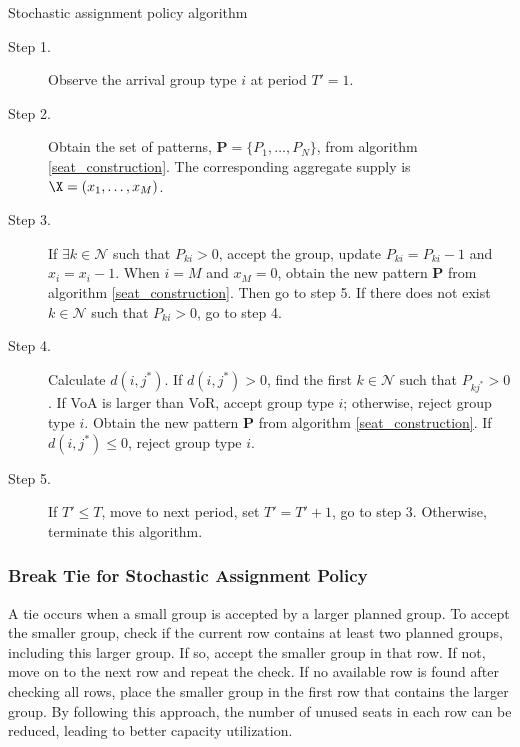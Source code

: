 \begin{algorithm}[H]
  \caption{Stochastic assignment policy algorithm}\label{algo_dynamic_policy}
  \begin{description}
    \item[Step 1.] Observe the arrival group type $i$ at period $T{'} =1$.
    \item[Step 2.] Obtain the set of patterns, $\mathbf{P} = \{P_1,\ldots,P_{N}\}$, from algorithm \ref{seat_construction}. The corresponding aggregate supply is $\X = (x_{1}, \ldots, x_{M})$.
    \item[Step 3.] If $\exists k \in \mathcal{N}$ such that $P_{ki} > 0$, accept the group, update $P_{ki} = P_{ki} -1$ and $x_{i} = x_{i} -1$. When $i = M$ and $x_{M} = 0$, obtain the new pattern $\mathbf{P}$ from algorithm \ref{seat_construction}. Then go to step 5. If there does not exist $k \in \mathcal{N}$ such that $P_{ki} > 0$, go to step 4.
    \item[Step 4.] Calculate $d(i,j^{*})$. If $d(i,j^{*})>0$, find the first $k \in \mathcal{N}$ such that $P_{k j^{*}} >0$. If VoA is larger than VoR, accept group type $i$; otherwise, reject group type $i$. Obtain the new pattern $\mathbf{P}$ from algorithm \ref{seat_construction}. If $d(i,j^{*}) \leq 0$, reject group type $i$.
    \item[Step 5.] If $T{'} \leq T$, move to next period, set $T{'} = T{'}+1$, go to step 3. Otherwise, terminate this algorithm.
  \end{description}
\end{algorithm}

\subsubsection{Break Tie for Stochastic Assignment Policy}
A tie occurs when a small group is accepted by a larger planned group. To accept the smaller group, check if the current row contains at least two planned groups, including this larger group. If so, accept the smaller group in that row. If not, move on to the next row and repeat the check. If no available row is found after checking all rows, place the smaller group in the first row that contains the larger group. By following this approach, the number of unused seats in each row can be reduced, leading to better capacity utilization.



